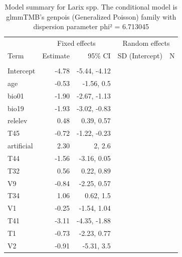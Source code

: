 \documentclass[
]{article}
\begin{document}
\begin{longtable}[t]{lrrrr}
\caption{\label{tab:summaries-tables}\label{tab:L}Model summary for Larix spp. The conditional model is glmmTMB's genpois (Generalized Poisson) family with dispersion parameter phi² = 6.713045}\\
\toprule
\multicolumn{1}{c}{ } & \multicolumn{2}{c}{Fixed effects} & \multicolumn{2}{c}{Random effects} \\
\cmidrule(l{3pt}r{3pt}){2-3} \cmidrule(l{3pt}r{3pt}){4-5}
Term & Estimate & 95\% CI & SD (Intercept) & N\\
\midrule
\addlinespace[0.3em]
\multicolumn{5}{l}{\textbf{Conditional model}}\\
\hspace{1em}Intercept & -4.78 & -5.44, -4.12 &  & \\
\hspace{1em}age & -0.53 & -1.56, 0.5 &  & \\
\hspace{1em}bio01 & -1.90 & -2.67, -1.13 &  & \\
\hspace{1em}bio19 & -1.93 & -3.02, -0.83 &  & \\
\hspace{1em}relelev & 0.48 & 0.39, 0.57 &  & \\
\hspace{1em}T45 & -0.72 & -1.22, -0.23 &  & \\
\hspace{1em}artificial & 2.30 & 2, 2.6 &  & \\
\hspace{1em}T44 & -1.56 & -3.16, 0.05 &  & \\
\hspace{1em}T32 & 0.56 & 0.22, 0.89 &  & \\
\hspace{1em}V9 & -0.84 & -2.25, 0.57 &  & \\
\hspace{1em}T34 & 1.06 & 0.62, 1.5 &  & \\
\hspace{1em}V1 & -0.25 & -1.54, 1.04 &  & \\
\hspace{1em}T41 & -3.11 & -4.35, -1.88 &  & \\
\hspace{1em}T1 & -0.73 & -2.23, 0.77 &  & \\
\hspace{1em}V2 & -0.91 & -5.31, 3.5 &  & \\

\end{longtable}
\end{document}
